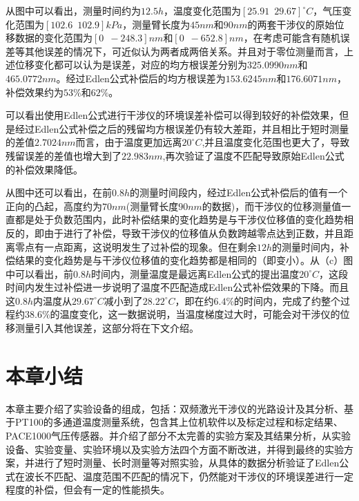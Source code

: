 从图中可以看出，测量时间约为$12.5h$，温度变化范围为$[25.91\,\,\,29.67]^{\circ}C$，气压变化范围为$[102.6\,\,\,102.9]kPa$，测量臂长度为$45nm$和$90nm$的两套干涉仪的原始位移数据的变化范围为$[0 \,\,\, -248.3]nm$和$[0\,\,\,-652.8]nm$，在考虑可能含有随机误差等其他误差的情况下，可近似认为两者成两倍关系。并且对于零位测量而言，上述位移变化都可以认为是误差，对应的均方根误差分别为$325.0990nm$和$465.0772nm$。经过Edlen公式补偿后的均方根误差为$153.6245nm$和$176.6071nm$，补偿效果约为$53\%$和$62\%$。

可以看出使用Edlen公式进行干涉仪的环境误差补偿可以得到较好的补偿效果，但是经过Edlen公式补偿之后的残留均方根误差仍有较大差距，并且相比于短时测量的差值$2.7024nm$而言，由于温度更加远离$20^{\circ}C$,并且温度变化范围也更大了，导致残留误差的差值也增大到了$22.983nm$,再次验证了温度不匹配导致原始Edlen公式的补偿效果降低。

从图中还可以看出，在前$0.8h$的测量时间段内，经过Edlen公式补偿后的值有一个正向的凸起，高度约为$70nm$(测量臂长度$90nm$的数据)，而干涉仪的位移测量值一直都是处于负数范围内，此时补偿结果的变化趋势是与干涉仪位移值的变化趋势相反的，即由于进行了补偿，导致干涉仪的位移值从负数跨越零点达到正数，并且距离零点有一点距离，这说明发生了过补偿的现象。但在剩余$12h$的测量时间内，补偿结果的变化趋势是与干涉仪位移值的变化趋势都是相同的（即变小）。从（c）图中可以看出，前$0.8h$时间内，测量温度是最远离Edlen公式的提出温度$20^{\circ}C$，这段时间内发生过补偿进一步说明了温度不匹配造成Edlen公式补偿效果的下降。而且这$0.8h$内温度从$29.67^{\circ}C$减小到了$28.22^{\circ}C$，即在约$6.4\%$的时间内，完成了约整个过程约$38.6\%$的温度变化，这一数据说明，当温度梯度过大时，可能会对干涉仪的位移测量引入其他误差，这部分将在下文介绍。

\section{本章小结}
本章主要介绍了实验设备的组成，包括：双频激光干涉仪的光路设计及其分析、基于PT100的多通道温度测量系统，包含其上位机软件以及标定过程和标定结果、PACE1000气压传感器。并介绍了部分不太完善的实验方案及其结果分析，从实验设备、实验变量、实验环境以及实验方法四个方面不断改进，并得到最终的实验方案，并进行了短时测量、长时测量等对照实验，从具体的数据分析验证了Edlen公式在波长不匹配、温度范围不匹配的情况下，仍然能对干涉仪的环境误差进行一定程度的补偿，但会有一定的性能损失。